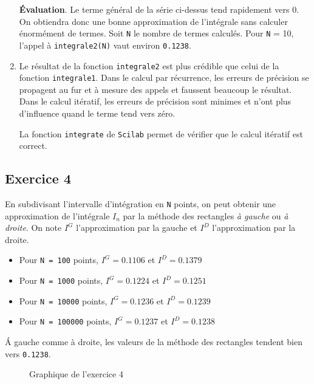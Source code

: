 \documentclass[a4paper,11pt]{article}
\theoremstyle{nonumberplain}
\theoremstyle{nonumberplain}
\begin{document}
\begin{enumerate}
        \textbf{\'{E}valuation}. Le terme général de la série ci-dessus tend rapidement vers $0$.
        On obtiendra donc une bonne approximation de l'intégrale sans calculer énormément de termes.
        Soit \texttt{N} le nombre de termes calculés. Pour \texttt{N} = 10, l'appel à \texttt{integrale2(N)} vaut environ \texttt{0.1238}.

        \item
        Le résultat de la fonction \texttt{integrale2} est plus crédible que celui de la fonction \texttt{integrale1}.
        Dans le calcul par récurrence, les erreurs de précision se propagent au fur et à mesure des appels et faussent beaucoup le résultat.
        Dans le calcul itératif, les erreurs de précision sont minimes et n'ont plus d'influence quand le terme tend vers zéro.

        La fonction \texttt{integrate} de \texttt{Scilab} permet de vérifier que le calcul itératif est correct.
    \end{enumerate}


\subsection*{Exercice 4}

    En subdivisant l'intervalle d'intégration en \texttt{N} points, on peut obtenir une
    approximation de l'intégrale $I_{n}$ par la méthode des rectangles \textit{à gauche} ou \textit{à droite}.
    On note $I^{G}$ l'approximation par la gauche et $I^{D}$ l'approximation par la droite.

    \begin{itemize}
        \item
        Pour \texttt{N = 100} points, $I^{G} = 0.1106$ et $I^{D} = 0.1379$

        \item
        Pour \texttt{N = 1000} points, $I^{G} = 0.1224$ et $I^{D} = 0.1251$

        \item
        Pour \texttt{N = 10000} points, $I^{G} = 0.1236$ et $I^{D} = 0.1239$

        \item
        Pour \texttt{N = 100000} points, $I^{G} = 0.1237$ et $I^{D} = 0.1238$
    \end{itemize}

    \'{A} gauche comme à droite, les valeurs de la méthode des rectangles tendent bien vers \texttt{0.1238}.
    \begin{figure}[H]
        \centering
        \caption{\label{graph_exo4} Graphique de l'exercice 4}
    \end{figure}
\end{document}
